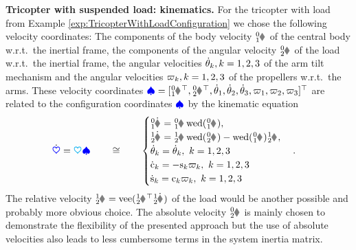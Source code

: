 \begin{Example}
\textbf{Tricopter with suspended load: kinematics.}
For the tricopter with load from Example \ref{exp:TricopterWithLoadConfiguration} we chose the following velocity coordinates:
The components of the body velocity $\bodyVel{0}{1}$ of the central body w.r.t.\ the inertial frame, the components of the angular velocity $\bodyAngVel{0}{2}$ of the load w.r.t.\ the inertial frame, the angular velocities $\aServod[k], k=1,2,3$ of the arm tilt mechanism and the angular velocities $\PropVel[k], k=1,2,3$ of the propellers w.r.t.\ the arms.
These velocity coordinates $\sysVel = [\bodyVel{0}{1}^\top, \bodyAngVel{0}{2}^\top, \aServod[1], \aServod[2], \aServod[3], \PropVel[1], \PropVel[2], \PropVel[3]]^\top$ are related to the configuration coordinates $\sysVel$ by the kinematic equation
\begin{align}
 \sysCoordd &= \kinMat \sysVel
\qquad\cong\qquad
 \begin{cases}
  \bodyHomoCoordd{0}{1} = \bodyHomoCoord{0}{1} \wedOp(\bodyVel{0}{1}), \\
  \bodyRotd{1}{2} = \bodyRot{1}{2} \wedOp(\bodyAngVel{0}{2}) - \wedOp(\bodyAngVel{0}{1}) \bodyRot{1}{2}, \\
  \aServod[k] = \aServod[k], \ k=1,2,3 \\
  \cPropAngled[k] = -\sPropAngle[k]\PropVel[k], \ k=1,2,3 \\
  \sPropAngled[k] =  \cPropAngle[k]\PropVel[k], \ k=1,2,3
 \end{cases}
 .
\end{align}
The relative velocity $\bodyAngVel{1}{2} = \veeOp(\bodyRot{1}{2}^\top \bodyRotd{1}{2})$ of the load would be another possible and probably more obvious choice.
The absolute velocity $\bodyAngVel{0}{2}$ is mainly chosen to demonstrate the flexibility of the presented approach but the use of absolute velocities also leads to less cumbersome terms in the system inertia matrix.


\end{Example}

